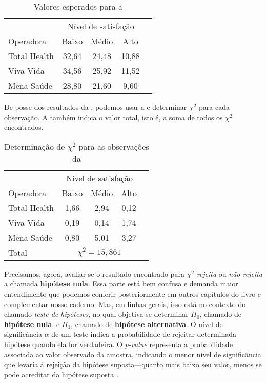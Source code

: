 \begin{sol}
\begin{table}[htpb]
    \centering
    \begin{tabular}{lcccc}
        \toprule
                     & \multicolumn{3}{c}{Nível de satisfação} \\
        \addlinespace
        Operadora    & Baixo & Médio & Alto \\
        \midrule
        Total Health & 32,64 & 24,48 & 10,88 \\
        Viva Vida    & 34,56 & 25,92 & 11,52 \\
        Mena Saúde   & 28,80 & 21,60 & 9,60 \\
        \bottomrule
    \end{tabular}
    \caption{Valores esperados para a }
    \label{tab:satisfacao-operadora-esperada}
\end{table}

De posse dos resultados da , podemos
usar a  e determinar $\chi^2$ para cada observação. A
 também indica o valor total,
isto é, a soma de todos os $\chi^2$ encontrados.

\begin{table}[htpb]
    \centering
    \begin{tabular}{lcccc}
        \toprule
                     & \multicolumn{3}{c}{Nível de satisfação} \\
        \addlinespace
        Operadora    & Baixo & Médio & Alto \\
        \midrule
        Total Health & 1,66 & 2,94 & 0,12 \\
        Viva Vida    & 0,19 & 0,14 & 1,74 \\
        Mena Saúde   & 0,80 & 5,01 & 3,27 \\
        \midrule
        Total        & \multicolumn{3}{c}{$\chi^2 = 15,861$} \\
        \bottomrule
    \end{tabular}
    \caption{Determinação de $\chi^2$ para as observações da }
    \label{tab:satisfacao-operadora-qui-quadrado}
\end{table}

Precisamos, agora, avaliar se o resultado encontrado para $\chi^2$
\emph{rejeita} ou \emph{não rejeita} a chamada \textbf{hipótese nula}. Essa
parte está bem confusa e demanda maior entendimento que podemos conferir
posteriormente em outros capítulos do livro e complementar nosso caderno. Mas,
em linhas gerais, isso está no contexto do chamado \emph{teste de hipóteses},
no qual objetiva-se determinar $H_0$, chamado de \textbf{hipótese nula}, e
$H_1$, chamado de \textbf{hipótese alternativa}. O nível de significância
$\alpha$ de um teste indica a probabilidade de rejeitar determinada hipótese
quando ela for verdadeira. O \emph{p-value} representa a probabilidade
associada ao valor observado da amostra, indicando o menor nível de
significância que levaria à rejeição da hipótese suposta---quanto mais baixo
seu valor, menos se pode acreditar da hipótese suposta
\parencite[p.~239]{favero}.


\end{sol}
